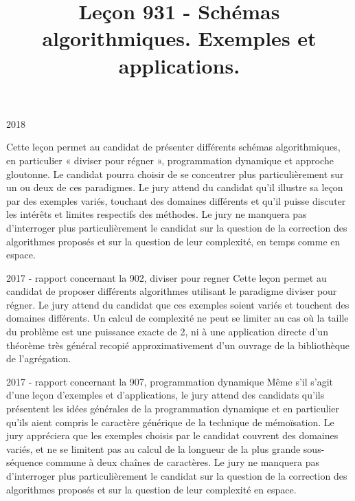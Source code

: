 \documentclass{agregfiche}
\title{Leçon 931 - Schémas algorithmiques.  Exemples et applications.}
\begin{document}
\maketitle

\secrapports

\begin{rapport}{2018}

Cette leçon permet au candidat de présenter différents schémas algorithmiques, en particulier « diviser
pour régner », programmation dynamique et approche gloutonne. Le candidat pourra choisir de se
concentrer plus particulièrement sur un ou deux de ces paradigmes. Le jury attend du candidat qu’il
illustre sa leçon par des exemples variés, touchant des domaines différents et qu’il puisse discuter les
intérêts et limites respectifs des méthodes. Le jury ne manquera pas d’interroger plus particulièrement le
candidat sur la question de la correction des algorithmes proposés et sur la question de leur complexité,
en temps comme en espace.

\end{rapport}

\begin{rapport}{2017 - rapport concernant la 902, diviser pour regner}
Cette leçon permet au candidat de proposer différents algorithmes utilisant le paradigme diviser pour
régner. Le jury attend du candidat que ces exemples soient variés et touchent des domaines différents.
Un calcul de complexité ne peut se limiter au cas où la taille du problème est une puissance exacte de
2, ni à une application directe d’un théorème très général recopié approximativement d’un ouvrage de
la bibliothèque de l’agrégation.
\end{rapport}

\begin{rapport}{2017 - rapport concernant la 907, programmation dynamique}
Même s’il s’agit d’une leçon d’exemples et d’applications, le jury attend des candidats qu’ils présentent
les idées générales de la programmation dynamique et en particulier qu’ils aient compris le caractère
générique de la technique de mémoïsation. Le jury appréciera que les exemples choisis par le candidat
couvrent des domaines variés, et ne se limitent pas au calcul de la longueur de la plus grande sous-
séquence commune à deux chaînes de caractères.
Le jury ne manquera pas d’interroger plus particulièrement le candidat sur la question de la correction
des algorithmes proposés et sur la question de leur complexité en espace.
\end{rapport}
\end{document}
